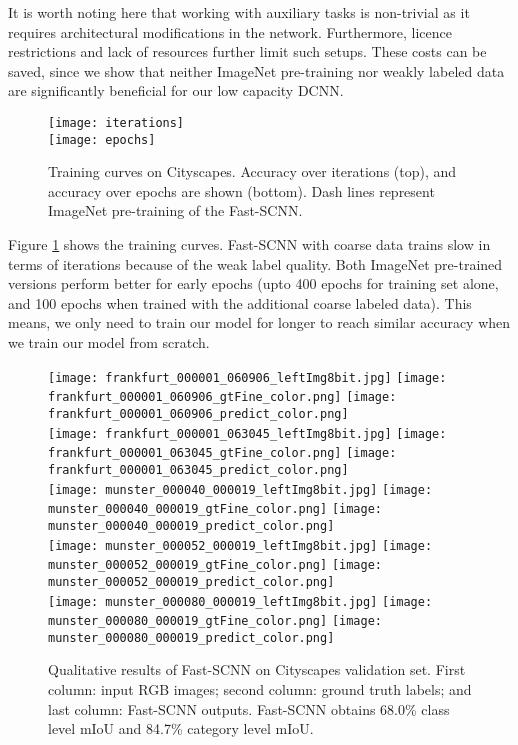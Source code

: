 \documentclass[10pt,twocolumn,letterpaper]{article}
\begin{document}
It is worth noting here that working with auxiliary tasks is non-trivial as it requires architectural modifications in the network. Furthermore, licence restrictions and lack of resources further limit such setups. These costs can be saved, since we show that neither ImageNet pre-training nor weakly labeled data are significantly beneficial for our low capacity DCNN.
\begin{figure}[t]
\texttt{[image: iterations]}\\
\texttt{[image: epochs]}
\caption{Training curves on Cityscapes. Accuracy over iterations (top), and accuracy over epochs are shown (bottom). Dash lines represent ImageNet pre-training of the Fast-SCNN.}
\label{fig:iterations-vs-class-miou}
\end{figure}
Figure \ref{fig:iterations-vs-class-miou} shows the training curves. Fast-SCNN with coarse data trains slow in terms of iterations because of the weak label quality. Both ImageNet pre-trained versions perform better for early epochs (upto 400 epochs for training set alone, and 100 epochs when trained with the additional coarse labeled data). This means, we only need to train our model for longer to reach similar accuracy when we train our model from scratch.\begin{figure*}[t]
\begin{center}
   \texttt{[image: frankfurt\_000001\_060906\_leftImg8bit.jpg]}
   \texttt{[image: frankfurt\_000001\_060906\_gtFine\_color.png]}
   \texttt{[image: frankfurt\_000001\_060906\_predict\_color.png]}
   \\
   \texttt{[image: frankfurt\_000001\_063045\_leftImg8bit.jpg]}
   \texttt{[image: frankfurt\_000001\_063045\_gtFine\_color.png]}
   \texttt{[image: frankfurt\_000001\_063045\_predict\_color.png]}
   \\
    \texttt{[image: munster\_000040\_000019\_leftImg8bit.jpg]}
   \texttt{[image: munster\_000040\_000019\_gtFine\_color.png]}
   \texttt{[image: munster\_000040\_000019\_predict\_color.png]}
   \\
    \texttt{[image: munster\_000052\_000019\_leftImg8bit.jpg]}
   \texttt{[image: munster\_000052\_000019\_gtFine\_color.png]}
   \texttt{[image: munster\_000052\_000019\_predict\_color.png]}
   \\
    \texttt{[image: munster\_000080\_000019\_leftImg8bit.jpg]}
   \texttt{[image: munster\_000080\_000019\_gtFine\_color.png]}
   \texttt{[image: munster\_000080\_000019\_predict\_color.png]}
\end{center}
   \caption{Qualitative results of Fast-SCNN on Cityscapes \cite{cityscaples2016} validation set. First column: input RGB images; second column: ground truth labels; and last column: Fast-SCNN outputs. Fast-SCNN obtains 68.0\% class level mIoU and 84.7\% category level mIoU.}
\label{fig:fast-scnn-results}
\end{figure*}
\end{document}
